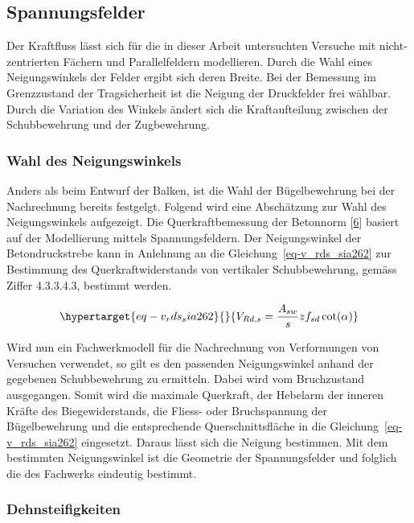 \documentclass[
  12pt,
  letterpaper,
  egregdoesnotlikesansseriftitles]{scrreprt}
\begin{document}
\hypertarget{spannungsfelder}{%
\subsection{Spannungsfelder}\label{spannungsfelder}}

Der Kraftfluss lässt sich für die in dieser Arbeit untersuchten Versuche
mit nicht-zentrierten Fächern und Parallelfeldern modellieren. Durch die
Wahl eines Neigungswinkels der Felder ergibt sich deren Breite. Bei der
Bemessung im Grenzzustand der Tragsicherheit ist die Neigung der
Druckfelder frei wählbar. Durch die Variation des Winkels ändert sich
die Kraftaufteilung zwischen der Schubbewehrung und der Zugbewehrung.

\hypertarget{wahl-des-neigungswinkels}{%
\subsubsection{Wahl des
Neigungswinkels}\label{wahl-des-neigungswinkels}}

Anders als beim Entwurf der Balken, ist die Wahl der Bügelbewehrung bei
der Nachrechnung bereits festgelgt. Folgend wird eine Abschätzung zur
Wahl des Neigungswinkels aufgezeigt. Die Querkraftbemessung der
Betonnorm {[}\protect\hyperlink{ref-SIA2013a}{6}{]} basiert auf der
Modellierung mittels Spannungsfeldern. Der Neigungswinkel der
Betondruckstrebe kann in Anlehnung an die
Gleichung~\ref{eq-v_rds_sia262} zur Bestimmung des Querkraftwiderstands
von vertikaler Schubbewehrung, gemäss Ziffer 4.3.3.4.3, bestimmt werden.

\begin{equation}\protect\hypertarget{eq-v_rds_sia262}{}{
V_{Rd,s} = \frac{A_{sw}}{s} z f_{sd} \cot(\alpha)
}\label{eq-v_rds_sia262}\end{equation}

Wird nun ein Fachwerkmodell für die Nachrechnung von Verformungen von
Versuchen verwendet, so gilt es den passenden Neigungswinkel anhand der
gegebenen Schubbewehrung zu ermitteln. Dabei wird vom Bruchzustand
ausgegangen. Somit wird die maximale Querkraft, der Hebelarm der inneren
Kräfte des Biegewiderstands, die Fliess- oder Bruchspannung der
Bügelbewehrung und die entsprechende Querschnittsfläche in die
Gleichung~\ref{eq-v_rds_sia262} eingesetzt. Daraus lässt sich die
Neigung bestimmen. Mit dem bestimmten Neigungswinkel ist die Geometrie
der Spannungsfelder und folglich die des Fachwerks eindeutig bestimmt.

\hypertarget{dehnsteifigkeiten}{%
\subsubsection{Dehnsteifigkeiten}\label{dehnsteifigkeiten}}
\end{document}
